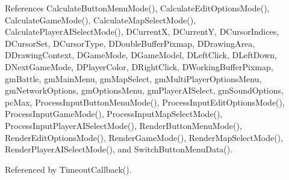 References Calculate\+Button\+Menu\+Mode(), Calculate\+Edit\+Options\+Mode(), Calculate\+Game\+Mode(), Calculate\+Map\+Select\+Mode(), Calculate\+Player\+A\+I\+Select\+Mode(), D\+CurrentX, D\+CurrentY, D\+Cursor\+Indices, D\+Cursor\+Set, D\+Cursor\+Type, D\+Double\+Buffer\+Pixmap, D\+Drawing\+Area, D\+Drawing\+Context, D\+Game\+Mode, D\+Game\+Model, D\+Left\+Click, D\+Left\+Down, D\+Next\+Game\+Mode, D\+Player\+Color, D\+Right\+Click, D\+Working\+Buffer\+Pixmap, gm\+Battle, gm\+Main\+Menu, gm\+Map\+Select, gm\+Multi\+Player\+Options\+Menu, gm\+Network\+Options, gm\+Options\+Menu, gm\+Player\+A\+I\+Select, gm\+Sound\+Options, pc\+Max, Process\+Input\+Button\+Menu\+Mode(), Process\+Input\+Edit\+Options\+Mode(), Process\+Input\+Game\+Mode(), Process\+Input\+Map\+Select\+Mode(), Process\+Input\+Player\+A\+I\+Select\+Mode(), Render\+Button\+Menu\+Mode(), Render\+Edit\+Options\+Mode(), Render\+Game\+Mode(), Render\+Map\+Select\+Mode(), Render\+Player\+A\+I\+Select\+Mode(), and Switch\+Button\+Menu\+Data().



Referenced by Timeout\+Callback().


